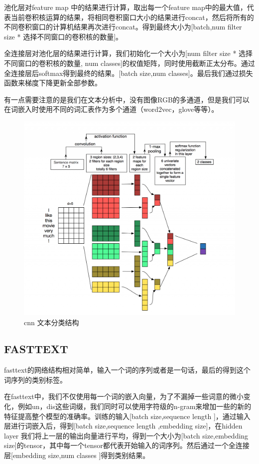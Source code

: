 \documentclass{article}
\begin{document}
池化层对feature map 中的结果进行计算，取出每一个feature map中的最大值，代表当前卷积核运算的结果，将相同卷积窗口大小的结果进行concat，然后将所有的不同卷积窗口的计算机结果再次进行concat。得到最终大小为[batch,num filter size * 选择不同窗口的卷积核的数量]。

全连接层对池化层的结果进行计算，我们初始化一个大小为[num filter size * 选择不同窗口的卷积核的数量, num classes]的权值矩阵，同时使用截断正太分布。通过全连接层后softmax得到最终的结果。[batch size,num classes]。最后我们通过损失函数来梯度下降更新全部参数。

有一点需要注意的是我们在文本分析中，没有图像RGB的多通道，但是我们可以在词嵌入时使用不同的词汇表作为多个通道（word2vec，glove等等）。


\begin{figure}
  \centering
  \includegraphics[width=.8\textwidth]{cnn.png} %
  \caption{cnn 文本分类结构}
  \label{fig:fig1}
\end{figure}



\subsection{FASTTEXT}
 
 fasttext的网络结构相对简单，输入一个词的序列或者是一句话，最后的得到这个词序列的类别标签。
 
 
 在fasttext中，我们不仅使用每一个词的嵌入向量，为了不漏掉一些词意的微小变化，例如un，dis这些词缀，我们同时可以使用字符级的n-gram来增加一些的新的特征提高整个模型的准确率。训练的输入[batch size,sequence length ]，通过输入层进行词嵌入后，得到[batch size,sequence length ,embedding size]，在hidden layer 我们将上一层的输出向量进行平均，得到一个大小为[batch size,embedding size]的tensor，其中每一个tensor都代表开始输入的词序列。然后通过一个全连接层[embedding size,num classes ]得到类别结果。
\end{document}
